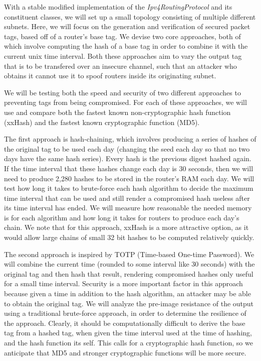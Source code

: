 \documentclass[12pt]{article} %
\begin{document}
With a stable modified implementation of the {\it Ipv4RoutingProtocol} and its constituent classes, we will set up a small topology consisting of multiple different subnets. Here, we will focus on the generation and verification of secured packet tags, based off of a router's base tag. We devise two core approaches, both of which involve computing the hash of a base tag in order to combine it with the current unix time interval. Both these approaches aim to vary the output tag that is to be transfered over an insecure channel, such that an attacker who obtains it cannot use it to spoof routers inside its originating subnet.

We will be testing both the speed and security of two different approaches to preventing tags from being compromised. For each of these approaches, we will use and compare both the fastest known non-cryptographic hash function (xxHash\cite{xxhash}) and the fastest known cryptographic function (MD5). 

The first approach is hash-chaining, which involves producing a series of hashes of the original tag to be used each day (changing the seed each day so that no two days have the same hash series). Every hash is the previous digest hashed again. If the time interval that these hashes change each day is 30 seconds, then we will need to produce 2,280 hashes to be stored in the router's RAM each day. We will test how long it takes to brute-force each hash algorithm to decide the maximum time interval that can be used and still render a compromised hash useless after its time interval has ended. We will measure how reasonable the needed memory is for each algorithm and how long it takes for routers to produce each day's chain. We note that for this approach, xxHash is a more attractive option, as it would allow large chains of small 32 bit hashes to be computed relatively quickly.

The second approach is inspired by TOTP (Time-based One-time Password). We will combine the current time (rounded to some interval like 30 seconds) with the original tag and then hash that result, rendering compromised hashes only useful for a small time interval. Security is a more important factor in this approach because given a time in addition to the hash algorithm, an attacker may be able to obtain the original tag. We will analyze the pre-image resistance of the output using a traditional brute-force approach, in order to determine the resilience of the approach. Clearly, it should be computationally difficult to derive the base tag from a hashed tag, when given the time interval used at the time of hashing, and the hash function its self. This calls for a cryptographic hash function, so we anticipate that MD5 and stronger cryptographic functions will be more secure. 








\end{document}
